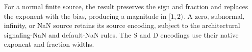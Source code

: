 For a normal finite source, the result preserves the sign and fraction and replaces the exponent with the bias,
producing a magnitude in \([1,2)\). A zero, subnormal, infinity, or NaN source retains its source encoding, subject
to the architectural signaling-NaN and default-NaN rules. The S and D encodings use their native exponent and fraction
widths.
